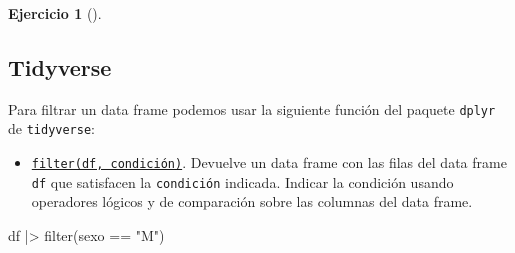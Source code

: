 \documentclass[
  a4paper,
]{scrreport}
\newenvironment{Shaded}{\begin{snugshade}}{\end{snugshade}}
\newcommand{\FunctionTok}[1]{\textcolor[rgb]{0.28,0.35,0.67}{#1}}
\newcommand{\NormalTok}[1]{\textcolor[rgb]{0.00,0.23,0.31}{#1}}
\newcommand{\SpecialCharTok}[1]{\textcolor[rgb]{0.37,0.37,0.37}{#1}}
\newcommand{\StringTok}[1]{\textcolor[rgb]{0.13,0.47,0.30}{#1}}
\providecommand{\tightlist}{%
  \setlength{\itemsep}{0pt}\setlength{\parskip}{0pt}}\usepackage{longtable,booktabs,array}
\theoremstyle{definition}
\newtheorem{exercise}{Ejercicio}[chapter]
\theoremstyle{remark}
\begin{document}
\begin{exercise}[]
\begin{enumerate}
\begin{tcolorbox}
  \section{Tidyverse}

  Para filtrar un data frame podemos usar la siguiente función del
  paquete \texttt{dplyr} de \texttt{tidyverse}:

  \begin{itemize}
  \tightlist
  \item
    \href{https://dplyr.tidyverse.org/reference/filter.html}{\texttt{filter(df,\ condición)}}.
    Devuelve un data frame con las filas del data frame \texttt{df} que
    satisfacen la \texttt{condición} indicada. Indicar la condición
    usando operadores lógicos y de comparación sobre las columnas del
    data frame.
  \end{itemize}

\begin{Shaded}
\begin{Highlighting}[]
\NormalTok{df }\SpecialCharTok{|\textgreater{}} \FunctionTok{filter}\NormalTok{(sexo }\SpecialCharTok{==} \StringTok{"M"}\NormalTok{)}
\end{Highlighting}
\end{Shaded}


\end{tcolorbox}
\end{enumerate}
\end{exercise}
\end{document}
